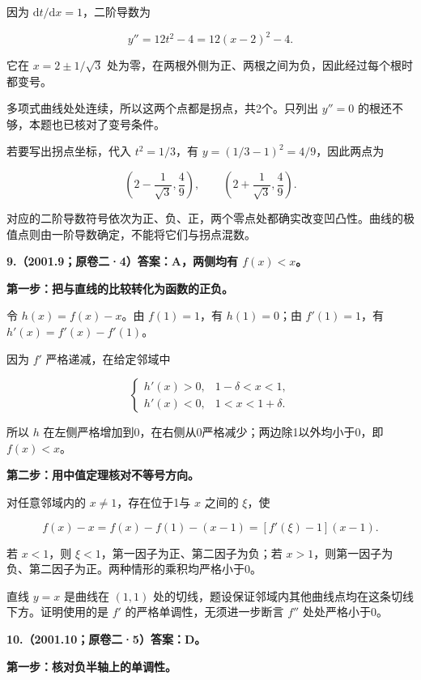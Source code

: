 \documentclass[UTF8,11pt,fontset=windows]{ctexart}
\begin{document}
因为 $\mathrm dt/\mathrm dx=1$，二阶导数为

$$
y''=12t^2-4=12(x-2)^2-4.
$$

它在 $x=2\pm1/\sqrt3$ 处为零，在两根外侧为正、两根之间为负，因此经过每个根时都变号。

多项式曲线处处连续，所以这两个点都是拐点，共2个。只列出 $y''=0$ 的根还不够，本题也已核对了变号条件。

若要写出拐点坐标，代入 $t^2=1/3$，有 $y=(1/3-1)^2=4/9$，因此两点为

$$
\left(2-\frac1{\sqrt3},\frac49\right),
\qquad\left(2+\frac1{\sqrt3},\frac49\right).
$$

对应的二阶导数符号依次为正、负、正，两个零点处都确实改变凹凸性。曲线的极值点则由一阶导数确定，不能将它们与拐点混数。

\clearpage

\textbf{9.（2001.9；原卷二·4）答案：A，两侧均有 $f(x)<x$。}

\textbf{第一步：把与直线的比较转化为函数的正负。}

令 $h(x)=f(x)-x$。由 $f(1)=1$，有 $h(1)=0$；由 $f'(1)=1$，有 $h'(x)=f'(x)-f'(1)$。

因为 $f'$ 严格递减，在给定邻域中

$$
\begin{cases}
h'(x)>0,&1-\delta<x<1,\\
h'(x)<0,&1<x<1+\delta.
\end{cases}
$$

所以 $h$ 在左侧严格增加到0，在右侧从0严格减少；两边除1以外均小于0，即 $\boxed{f(x)<x}$。

\textbf{第二步：用中值定理核对不等号方向。}

对任意邻域内的 $x\ne1$，存在位于1与 $x$ 之间的 $\xi$，使

$$
f(x)-x=f(x)-f(1)-(x-1)
=[f'(\xi)-1](x-1).
$$

若 $x<1$，则 $\xi<1$，第一因子为正、第二因子为负；若 $x>1$，则第一因子为负、第二因子为正。两种情形的乘积均严格小于0。

直线 $y=x$ 是曲线在 $(1,1)$ 处的切线，题设保证邻域内其他曲线点均在这条切线下方。证明使用的是 $f'$ 的严格单调性，无须进一步断言 $f''$ 处处严格小于0。

\clearpage

\textbf{10.（2001.10；原卷二·5）答案：D。}

\textbf{第一步：核对负半轴上的单调性。}
\end{document}

